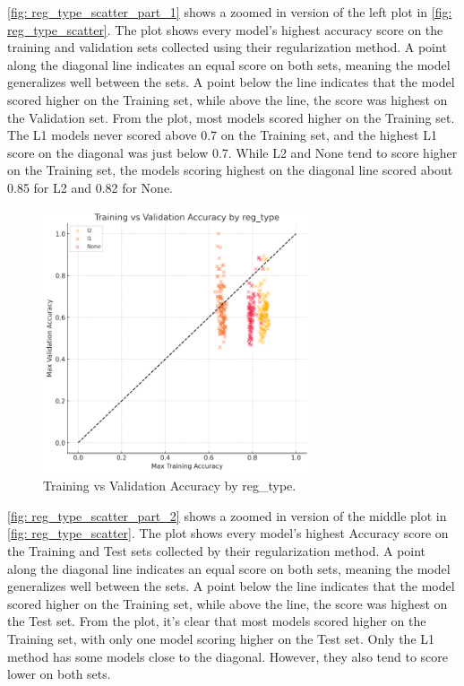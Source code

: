 \autoref{fig: reg_type_scatter_part_1} shows a zoomed in version of the left plot in \autoref{fig: reg_type_scatter}. The plot shows every model's highest accuracy score on the training and validation sets collected using their regularization method. A point along the diagonal line indicates an equal score on both sets, meaning the model generalizes well between the sets. A point below the line indicates that the model scored higher on the Training set, while above the line, the score was highest on the Validation set. From the plot, most models scored higher on the Training set. The L1 models never scored above 0.7 on the Training set, and the highest L1 score on the diagonal was just below 0.7. While L2 and None tend to score higher on the Training set, the models scoring highest on the diagonal line scored about 0.85 for L2 and 0.82 for None.

\begin{figure}[H]
    \centering
    \includegraphics[width=0.7\textwidth]{Figures/results/scatter_reg_type_part_1.png}
    \caption{Training vs Validation Accuracy by reg\_type.}
    \label{fig: reg_type_scatter_part_1}
\end{figure}

\autoref{fig: reg_type_scatter_part_2} shows a zoomed in version of the middle plot in \autoref{fig: reg_type_scatter}. The plot shows every model's highest Accuracy score on the Training and Test sets collected by their regularization method. A point along the diagonal line indicates an equal score on both sets, meaning the model generalizes well between the sets. A point below the line indicates that the model scored higher on the Training set, while above the line, the score was highest on the Test set. From the plot, it's clear that most models scored higher on the Training set, with only one model scoring higher on the Test set. Only the L1 method has some models close to the diagonal. However, they also tend to score lower on both sets.

